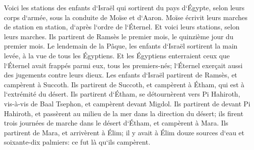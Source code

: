 \verse Voici les stations des enfants d`Israël qui sortirent du pays d`Égypte, selon leurs corps d`armée, sous la conduite de Moïse et d`Aaron. 
\verse Moïse écrivit leurs marches de station en station, d`après l`ordre de l`Éternel. Et voici leurs stations, selon leurs marches. 
\verse Ils partirent de Ramsès le premier mois, le quinzième jour du premier mois. Le lendemain de la Pâque, les enfants d`Israël sortirent la main levée, à la vue de tous les Égyptiens. 
\verse Et les Égyptiens enterraient ceux que l`Éternel avait frappés parmi eux, tous les premiers-nés; l`Éternel exerçait aussi des jugements contre leurs dieux. 
\verse Les enfants d`Israël partirent de Ramsès, et campèrent à Succoth. 
\verse Ils partirent de Succoth, et campèrent à Étham, qui est à l`extrémité du désert. 
\verse Ils partirent d`Étham, se détournèrent vers Pi Hahiroth, vis-à-vis de Baal Tsephon, et campèrent devant Migdol. 
\verse Ils partirent de devant Pi Hahiroth, et passèrent au milieu de la mer dans la direction du désert; ils firent trois journées de marche dans le désert d`Étham, et campèrent à Mara. 
\verse Ils partirent de Mara, et arrivèrent à Élim; il y avait à Élim douze sources d`eau et soixante-dix palmiers: ce fut là qu`ils campèrent. 
